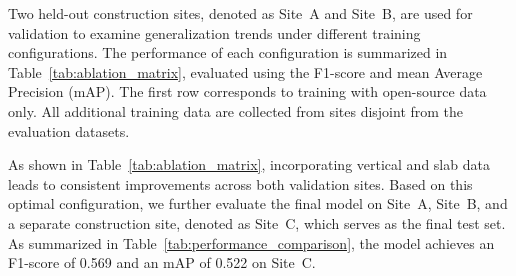 \documentclass{article}
\begin{document}
Two held-out construction sites, denoted as Site~A and Site~B, are used for validation to examine generalization trends under different training configurations. The performance of each configuration is summarized in Table~\ref{tab:ablation_matrix}, evaluated using the F1-score and mean Average Precision (mAP). The first row corresponds to training with open-source data only. All additional training data are collected from sites disjoint from the evaluation datasets.



As shown in Table~\ref{tab:ablation_matrix}, incorporating vertical and slab data leads to consistent improvements across both validation sites. Based on this optimal configuration, we further evaluate the final model on Site~A, Site~B, and a separate construction site, denoted as Site~C, which serves as the final test set. As summarized in Table~\ref{tab:performance_comparison}, the model achieves an F1-score of 0.569 and an mAP of 0.522 on Site~C.



\begin{table}[ht]
  \centering
  \caption{Ablation study on the proposed components for rebar intersection detection.}
  \label{tab:ablation_matrix}
\end{table}
\end{document}
